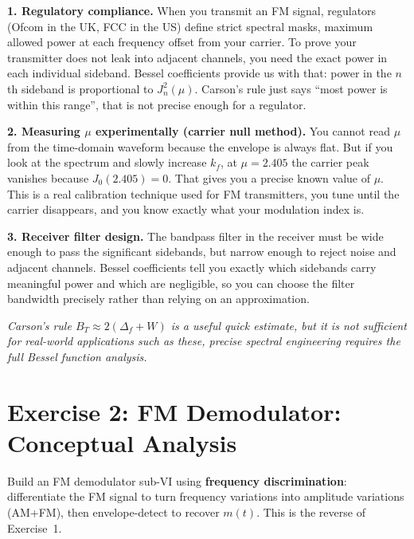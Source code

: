 \documentclass[../../main.tex]{subfiles}
\begin{document}
\begin{KeyBox}

\textbf{1. Regulatory compliance.} When you transmit an FM signal, regulators (Ofcom in the UK, FCC in the US) define strict spectral masks, maximum allowed power at each frequency offset from your carrier. To prove your transmitter does not leak into adjacent channels, you need the exact power in each individual sideband. Bessel coefficients provide us with that: power in the $n$th sideband is proportional to $J_n^2(\mu)$. Carson's rule just says ``most power is within this range'',  that is not precise enough for a regulator.

\vspace{0.5em}

\textbf{2. Measuring $\mu$ experimentally (carrier null method).} You cannot read $\mu$ from the time-domain waveform because the envelope is always flat. But if you look at the spectrum and slowly increase $k_f$, at $\mu = 2.405$ the carrier peak vanishes because $J_0(2.405) = 0$. That gives you a precise known value of $\mu$. This is a real calibration technique used for FM transmitters,  you tune until the carrier disappears, and you know exactly what your modulation index is.

\vspace{0.5em}

\textbf{3. Receiver filter design.} The bandpass filter in the receiver must be wide enough to pass the significant sidebands, but narrow enough to reject noise and adjacent channels. Bessel coefficients tell you exactly which sidebands carry meaningful power and which are negligible, so you can choose the filter bandwidth precisely rather than relying on an approximation.

\vspace{0.5em}

\textit{Carson's rule $B_T \approx 2(\Delta_f + W)$ is a useful quick estimate, but it is not sufficient for real-world applications such as these, precise spectral engineering requires the full Bessel function analysis.}
\end{KeyBox}

\newpage

\section{Exercise 2: FM Demodulator: Conceptual Analysis}

\begin{GoalBox}
Build an FM demodulator sub-VI using \textbf{frequency discrimination}: differentiate the FM signal to turn frequency variations into amplitude variations (AM+FM), then envelope-detect to recover $m(t)$. This is the reverse of Exercise~1.
\end{GoalBox}
\end{document}

